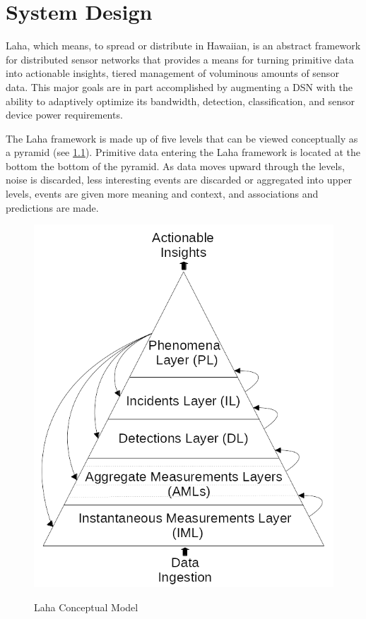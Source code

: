 \chapter{System Design}
Laha, which means, to spread or distribute in Hawaiian, is an abstract framework for distributed sensor networks that provides a means for turning primitive data into actionable insights, tiered management of voluminous amounts of sensor data. This major goals are in part accomplished by augmenting a DSN with the ability to adaptively optimize its bandwidth, detection, classification, and sensor device power requirements.

The Laha framework is made up of five levels that can be viewed conceptually as a pyramid (see \ref{laha-figure}). Primitive data entering the Laha framework is located at the bottom the bottom of the pyramid. As data moves upward through the levels, noise is discarded, less interesting events are discarded or aggregated into upper levels, events are given more meaning and context, and associations and predictions are made. 

\begin{figure}
\caption{Laha Conceptual Model}
\centering
\includegraphics{figures/laha.png}	
\label{laha-figure}
\end{figure}

